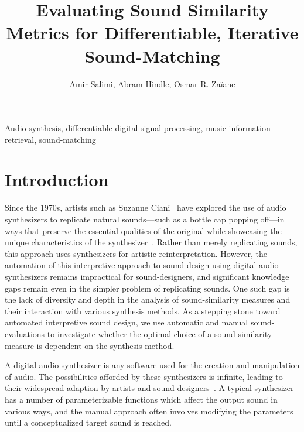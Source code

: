 \documentclass[lettersize,journal]{IEEEtran}
\begin{document}



\title{Evaluating Sound Similarity Metrics for Differentiable, Iterative Sound-Matching}

\author{Amir Salimi, Abram Hindle, Osmar R. Za{\"i}ane}
\maketitle
 
\begin{IEEEkeywords}
Audio synthesis, differentiable digital signal processing, music information retrieval, sound-matching
\end{IEEEkeywords}
\hphantom{\vphantom{\begin{minipage}{\textwidth}\end{minipage}}}


\section{Introduction}
Since the 1970s, artists such as Suzanne Ciani~\cite{ciani_life_in_waves} have explored the use of audio synthesizers to replicate natural sounds—such as a bottle cap popping off—in ways that preserve the essential qualities of the original while showcasing the unique characteristics of the synthesizer~\cite{creativecherep2024}. Rather than merely replicating sounds, this approach uses synthesizers for artistic reinterpretation. However, the automation of this interpretive approach to sound design using digital audio synthesizers remains impractical for sound-designers, and significant knowledge gaps remain even in the simpler problem of replicating sounds. One such gap is the lack of diversity and depth in the analysis of sound-similarity measures and their interaction with various synthesis methods. As a stepping stone toward automated interpretive sound design, we use automatic and manual sound-evaluations to investigate whether the optimal choice of a sound-similarity measure is dependent on the synthesis method.

A digital audio synthesizer is any software used for the creation and manipulation of audio. The possibilities afforded by these synthesizers is infinite, leading to their widespread adaption by artists and sound-designers~\cite{lyons1997understanding,russ1999sound,stranneby2004digital}. A typical synthesizer has a number of parameterizable functions which affect the output sound in various ways, and the manual approach often involves modifying the parameters until a conceptualized target sound is reached. 
\end{document}
